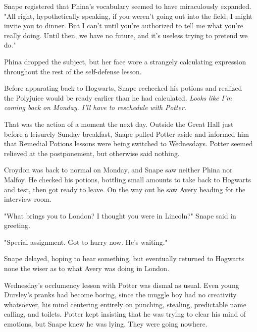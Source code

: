 Snape registered that Phina's vocabulary seemed to have miraculously expanded. "All right, hypothetically speaking, if you weren't going out into the field, I might invite you to dinner. But I can't until you're authorized to tell me what you're really doing. Until then, we have no future, and it's useless trying to pretend we do."

Phina dropped the subject, but her face wore a strangely calculating expression throughout the rest of the self-defense lesson.

Before apparating back to Hogwarts, Snape rechecked his potions and realized the Polyjuice would be ready earlier than he had calculated. \emph{Looks like I'm coming back on Monday. I'll have to reschedule with Potter.}

That was the action of a moment the next day. Outside the Great Hall just before a leisurely Sunday breakfast, Snape pulled Potter aside and informed him that Remedial Potions lessons were being switched to Wednesdays. Potter seemed relieved at the postponement, but otherwise said nothing.

Croydon was back to normal on Monday, and Snape saw neither Phina nor Malfoy. He checked his potions, bottling small amounts to take back to Hogwarts and test, then got ready to leave. On the way out he saw Avery heading for the interview room.

"What brings you to London? I thought you were in Lincoln?" Snape said in greeting.

"Special assignment. Got to hurry now. He's waiting."

Snape delayed, hoping to hear something, but eventually returned to Hogwarts none the wiser as to what Avery was doing in London.

Wednesday's occlumency lesson with Potter was dismal as usual. Even young Dursley's pranks had become boring, since the muggle boy had no creativity whatsoever, his mind centering entirely on punching, stealing, predictable name calling, and toilets. Potter kept insisting that he was trying to clear his mind of emotions, but Snape knew he was lying. They were going nowhere.


